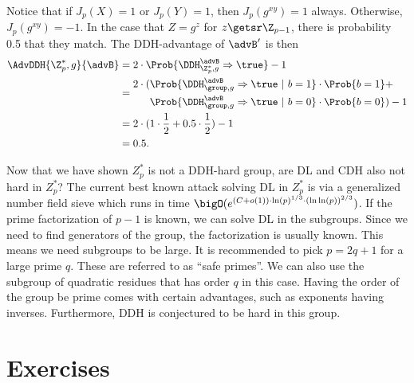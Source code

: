 Notice that if $J_p(X) = 1$ or $J_p(Y) = 1$, then $J_p(g^{xy})=1$ always. Otherwise, $J_p(g^{xy})=-1$. In the case that $Z=g^z$ for $z \getsr \Z_{p-1}$, there is probability 0.5 that they match. The DDH-advantage of $\advB'$ is then
\begin{align*}
	\AdvDDH{\Z_p^*,g}{\advB} &= 2 \cdot \Prob{\DDH_{\Z_p^*, g}^\advB\Rightarrow\true} - 1 \\
	&=
	\begin{aligned}
		2 \cdot (&\Prob{\DDH_{\group, g}^\advB\Rightarrow\true \ | \ b=1}\cdot\Prob{b=1} + \\
		&\Prob{\DDH_{\group, g}^\advB\Rightarrow\true \ | \ b=0}\cdot\Prob{b=0}) - 1
	\end{aligned} \\
	&= 2 \cdot (1 \cdot \frac{1}{2} + 0.5 \cdot \frac{1}{2}) - 1 \\
	&= 0.5.
\end{align*}

Now that we have shown $Z_p^*$ is not a DDH-hard group, are DL and CDH also not hard in $Z_p^*$? The current best known attack solving DL in $Z_p^*$ is via a generalized number field sieve which runs in time $\bigO(e^{ (C+o(1))\cdot \ln(p)^{1/3} \cdot (\ln\ln(p))^{2/3 }} )$. If the prime factorization of $p-1$ is known, we can solve DL in the subgroups. Since we need to find generators of the group, the factorization is usually known. This means we need subgroups to be large. It is recommended to pick $p=2q+1$ for a large prime $q$. These are referred to as ``safe primes''. We can also use the subgroup of quadratic residues that has order $q$ in this case. Having the order of the group be prime comes with certain advantages, such as exponents having inverses. Furthermore, DDH is conjectured to be hard in this group. 

\section*{Exercises}

